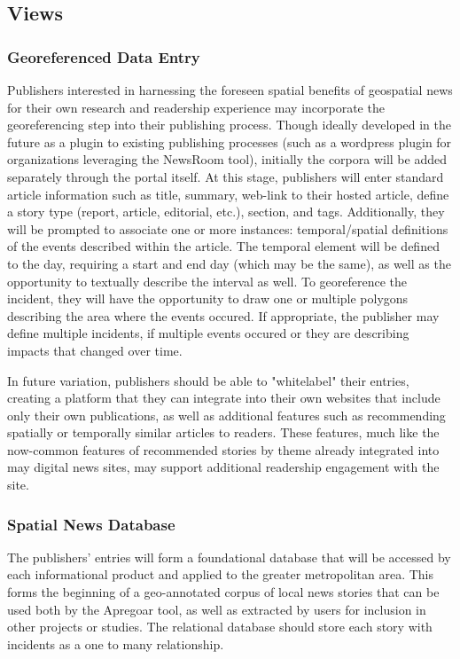 \subsection{Views}
\subsubsection{Georeferenced Data Entry}
Publishers interested in harnessing the foreseen spatial benefits of geospatial news for their own research and readership experience may incorporate the georeferencing step into their publishing process. Though ideally developed in the future as a plugin to existing publishing processes (such as a wordpress plugin for organizations leveraging the NewsRoom tool), initially the corpora will be added separately through the portal itself. At this stage, publishers will enter standard article information such as title, summary, web-link to their hosted article, define a story type (report, article, editorial, etc.), section, and tags. Additionally, they will be prompted to associate one or more instances: temporal/spatial definitions of the events described within the article. The temporal element will be defined to the day, requiring a start and end day (which may be the same), as well as the opportunity to textually describe the interval as well.  To georeference the incident, they will have the opportunity to draw one or multiple polygons describing the area where the events occured. If appropriate, the publisher may define multiple incidents, if multiple events occured or they are describing impacts that changed over time.

In future variation, publishers should be able to "whitelabel" their entries, creating a platform that they can integrate into their own websites that include only their own publications, as well as additional features such as recommending spatially or temporally similar articles to readers. These features, much like the now-common features of recommended stories by theme already integrated into may digital news sites, may support additional readership engagement with the site.



\subsubsection{Spatial News Database}
The publishers' entries will form a foundational database that will be accessed by each informational product and applied to the greater metropolitan area. This forms the beginning of a geo-annotated corpus of local news stories that can be used both by the Apregoar tool, as well as extracted by users for inclusion in other projects or studies. %
The relational database should store each story with incidents as a one to many relationship. 

